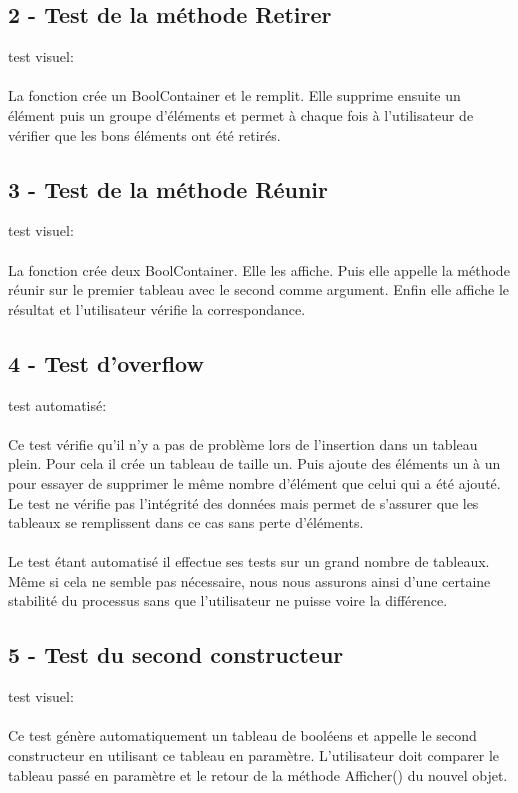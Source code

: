 \documentclass[a4paper, 12pts]{article}
\begin{document}
\subsection{2 - Test de la méthode Retirer}
test visuel:
\paragraph{}
La fonction crée un BoolContainer et le remplit. Elle supprime ensuite un élément puis un groupe d’éléments et permet à chaque fois à l’utilisateur de vérifier que les bons éléments ont été retirés.

\subsection{3 - Test de la méthode Réunir}
test visuel:
\paragraph{}
La fonction crée deux BoolContainer. Elle les affiche. Puis elle appelle la méthode réunir sur le premier tableau avec le second comme argument. Enfin elle affiche le résultat et l’utilisateur vérifie la correspondance.

\subsection{4 - Test d'overflow}
test automatisé:
\paragraph{}
Ce test vérifie qu'il n'y a pas de problème lors de l'insertion dans un tableau plein. Pour cela il crée un tableau de taille un. Puis ajoute des éléments un à un pour essayer de supprimer le même nombre d’élément que celui qui a été ajouté. Le test ne vérifie pas l’intégrité des données mais permet de s'assurer que les tableaux se remplissent dans ce cas sans perte d'éléments.
\paragraph{}
Le test étant automatisé il effectue ses tests sur un grand nombre de tableaux. Même si cela ne semble pas nécessaire, nous nous assurons ainsi d'une certaine stabilité du processus sans que l'utilisateur ne puisse voire la différence.

\subsection{5 - Test du second constructeur}
test visuel:
\paragraph{}
Ce test génère automatiquement un tableau de booléens et appelle le second constructeur en utilisant ce tableau en paramètre. L'utilisateur doit comparer le tableau passé en paramètre et le retour de la méthode Afficher() du nouvel objet.
\end{document}
